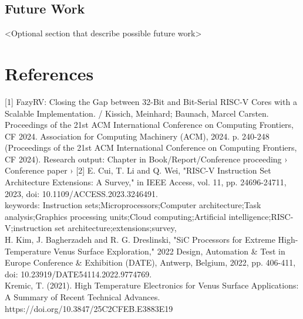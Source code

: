 \documentclass[10pt,twocolumn]{article}
\begin{document}
\subsection{Future Work}
<Optional section that describe possible future work>

\section*{References}
[1] FazyRV: Closing the Gap between 32-Bit and Bit-Serial RISC-V Cores with a Scalable Implementation. / Kissich, Meinhard; Baunach, Marcel Carsten.
Proceedings of the 21st ACM International Conference on Computing Frontiers, CF 2024. Association for Computing Machinery (ACM), 2024. p. 240-248 (Proceedings of the 21st ACM International Conference on Computing Frontiers, CF 2024).
Research output: Chapter in Book/Report/Conference proceeding › Conference paper ›
[2] E. Cui, T. Li and Q. Wei, "RISC-V Instruction Set Architecture Extensions: A Survey," in IEEE Access, vol. 11, pp. 24696-24711, 2023, doi: 10.1109/ACCESS.2023.3246491.\\
keywords: {Instruction sets;Microprocessors;Computer architecture;Task analysis;Graphics processing units;Cloud computing;Artificial intelligence;RISC-V;instruction set architecture;extensions;survey},\\
[3] H. Kim, J. Bagherzadeh and R. G. Dreslinski, "SiC Processors for Extreme High- Temperature Venus Surface Exploration," 2022 Design, Automation & Test in Europe Conference & Exhibition (DATE), Antwerp, Belgium, 2022, pp. 406-411, doi: 10.23919/DATE54114.2022.9774769.\\
[4] Kremic, T. (2021). High Temperature Electronics for Venus Surface Applications: A Summary of Recent Technical Advances. https://doi.org/10.3847/25C2CFEB.E3883E19\\
\end{document}
